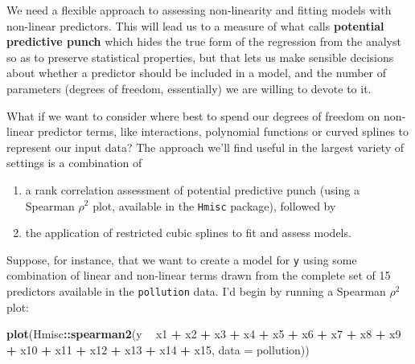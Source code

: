 \documentclass[]{book}
\newenvironment{Shaded}{\begin{snugshade}}{\end{snugshade}}
\newcommand{\KeywordTok}[1]{\textcolor[rgb]{0.13,0.29,0.53}{\textbf{#1}}}
\newcommand{\DataTypeTok}[1]{\textcolor[rgb]{0.13,0.29,0.53}{#1}}
\newcommand{\StringTok}[1]{\textcolor[rgb]{0.31,0.60,0.02}{#1}}
\newcommand{\OperatorTok}[1]{\textcolor[rgb]{0.81,0.36,0.00}{\textbf{#1}}}
\newcommand{\NormalTok}[1]{#1}
\providecommand{\tightlist}{%
  \setlength{\itemsep}{0pt}\setlength{\parskip}{0pt}}
\theoremstyle{definition}
\theoremstyle{definition}
\theoremstyle{definition}
\theoremstyle{remark}
\begin{document}
We need a flexible approach to assessing non-linearity and fitting
models with non-linear predictors. This will lead us to a measure of
what \citet{Harrell2001} calls \textbf{potential predictive punch} which
hides the true form of the regression from the analyst so as to preserve
statistical properties, but that lets us make sensible decisions about
whether a predictor should be included in a model, and the number of
parameters (degrees of freedom, essentially) we are willing to devote to
it.

What if we want to consider where best to spend our degrees of freedom
on non-linear predictor terms, like interactions, polynomial functions
or curved splines to represent our input data? The approach we'll find
useful in the largest variety of settings is a combination of

\begin{enumerate}
\def\labelenumi{\arabic{enumi}.}
\tightlist
\item
  a rank correlation assessment of potential predictive punch (using a
  Spearman \(\rho^2\) plot, available in the \texttt{Hmisc} package),
  followed by
\item
  the application of restricted cubic splines to fit and assess models.
\end{enumerate}

Suppose, for instance, that we want to create a model for \texttt{y}
using some combination of linear and non-linear terms drawn from the
complete set of 15 predictors available in the \texttt{pollution} data.
I'd begin by running a Spearman \(\rho^2\) plot:

\begin{Shaded}
\begin{Highlighting}[]
\KeywordTok{plot}\NormalTok{(Hmisc}\OperatorTok{::}\KeywordTok{spearman2}\NormalTok{(y }\OperatorTok{~}\StringTok{ }\NormalTok{x1 }\OperatorTok{+}\StringTok{ }\NormalTok{x2 }\OperatorTok{+}\StringTok{ }\NormalTok{x3 }\OperatorTok{+}\StringTok{ }\NormalTok{x4 }\OperatorTok{+}\StringTok{ }\NormalTok{x5 }\OperatorTok{+}\StringTok{ }\NormalTok{x6 }\OperatorTok{+}\StringTok{ }\NormalTok{x7 }\OperatorTok{+}
\StringTok{                          }\NormalTok{x8 }\OperatorTok{+}\StringTok{ }\NormalTok{x9 }\OperatorTok{+}\StringTok{ }\NormalTok{x10 }\OperatorTok{+}\StringTok{ }\NormalTok{x11 }\OperatorTok{+}\StringTok{ }\NormalTok{x12 }\OperatorTok{+}\StringTok{ }\NormalTok{x13 }\OperatorTok{+}
\StringTok{                          }\NormalTok{x14 }\OperatorTok{+}\StringTok{ }\NormalTok{x15, }\DataTypeTok{data =}\NormalTok{ pollution))}
\end{Highlighting}
\end{Shaded}
\end{document}
